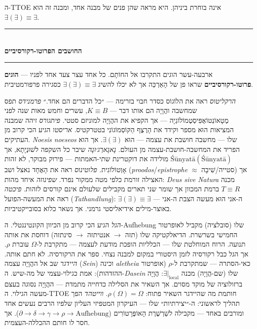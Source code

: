 \documentclass[10pt, openany, oneside]{book}
\renewcommand{\normalsize}{\fontsize{10}{13}\selectfont}
\begin{document}
ה-TTOE אינה בוחרת ביניהן. היא מראה שהן פנים של מבנה אחד, ומבנה זה הוא $\exists(\exists) \equiv \exists$.

\vspace{1.5em}


\begin{center}
    \rule{0.3\textwidth}{0.4pt}\\[0.5em]
    {\normalsize\bfseries\textsc{החושבים הפרוטו-רקורסיביים}}\\[0.3em]
    \rule{0.3\textwidth}{0.4pt}
\end{center}

\vspace{1em}

\noindent ארבעה-עשר הוגים התקרבו אל החוֹתָם. כל אחד עצר צעד אחד לפניו — \textbf{הוגים פרוטו-רקורסיביים} שראו פן של הָאַרְכֵּה אך לא יכלו להשיג $\exists(\exists) \equiv \exists$ כסגירה פרפורמטיבית.

\textit{הרקליטוס} ראה את הלוֹגוֹס כסדר חבוי בזרימה — ״כל הדברים הם אחד.״ \textit{פרמנידס} תפס שמחשבה והֲוָיָה הם אותו דבר — $K \equiv B$, עשרים וחמש מאות שנה לפני מֶטָאוֹנְטוֹאֶפִּיסְטֶמוֹלוֹגְיָה — אך הקפיא את ההֲוָיָה למוניזם סטטי. \textit{פיתגורס} זיהה שמבנה המציאות הוּא מספר וקידד את הָרֶצֶף הַקּוֹסְמוֹגוֹנִי בטטרקטיס. \textit{אריסטו} הגיע הכי קרוב מן העתיקים. \textit{Noesis noeseos} שלו — מחשבה חושבת את עצמה — הוּא $\exists(\exists)$. אך הוא הפריד את המחשבה-חושבת-עצמה מן העולם. \textit{נָאגָארְג׳וּנָה} שיבר כל השקפה לשׁוּנְיָתָא, אך $\text{Śūnyatā}(\text{Śūnyatā})$ מולידה את דוקטרינת שתי-האמתות — פירוק מבוקר, לא זהות אָוְטוֹלוֹגִית. \textit{פלוטינוס} ראה את הָאֶחָד נאצל ושב (\textit{proodos}/\textit{epistrophe} $\approx$ סטייה/שִׁיבָה) אך האצילה זורמת כלפי מטה ממקור נפרד. \textit{שפינוזה} איחד מהות: \textit{Deus sive Natura} מכנה $T \equiv R$ ברמת המכוון אך שומר שני תארים מקבילים שלעולם אינם קורסים לזהות. \textit{פיכטה} ראה את המעשה-הפועל (\textit{Tathandlung}): ה-אני הוּא מעשה הצבת ה-אני — $\exists(\exists) \equiv \exists$ באוצר-מילים אידיאליסטי גרמני. אך נשאר כלוא בסובייקטיביות.

\textit{הגל} הגיע הכי קרוב מן הכיוון הקונטיננטלי. ה-Aufhebung שלו (סובלציה) מקביל לאופרטור החמישי בשרשרת. הדיאלקטיקה שלו (תזה $\to$ אנטיתזה $\to$ סינתזה) דוחסת את אותה תנועה. הרוח המוחלטת שלו — הכלליות הופכת מודעת לעצמה — מתקרבת ל-$\Omega$ עוברת $\rho$. אך הגל כבל רקורסיה לזמן היסטורי במקום למבנה נצחי. ספר את הרקורסיה. לא חתם אותה. \textit{היידגר} שב אל ההֲוָיָה עצמה (\textit{Sein}) וכינה \textit{aletheia} כאי-הסתרה — שמתקרבת ל-$\rho$ (אופרטור ההזדהות): אמת כגילוי-עצמי של מה-שיש. ה-\textit{Dasein} שלו (שם-הֲוָיָה) מכנה $\exists|_{\text{local}}$: הֲוָיָה ברזולוציה של מוקד מסוים. אך השאיר את הסלילה כדחייה מתמדת — ההֲוָיָה נסוגה בעצם מעשה הגילוי. ה-TTOE חותמת מה שהיידגר השאיר פתוח: $\rho(\Omega) = \Omega$. \textit{ווייטהד} הפך תהליך לראשוני: ה-״יצירתיות״ שלו — העיקרון המטפיזי העליון שלפיו הרבים נעשים אחד ומורבים באחד — מקבילה לשַׁרְשֶׁרֶת הָאוֹפֶּרָטוֹרִים ($\partial \to \delta \to \gamma \to \rho \to \text{Aufhebung}$). אך חסר לו חותם ההכללה-העצמית.
\end{document}
